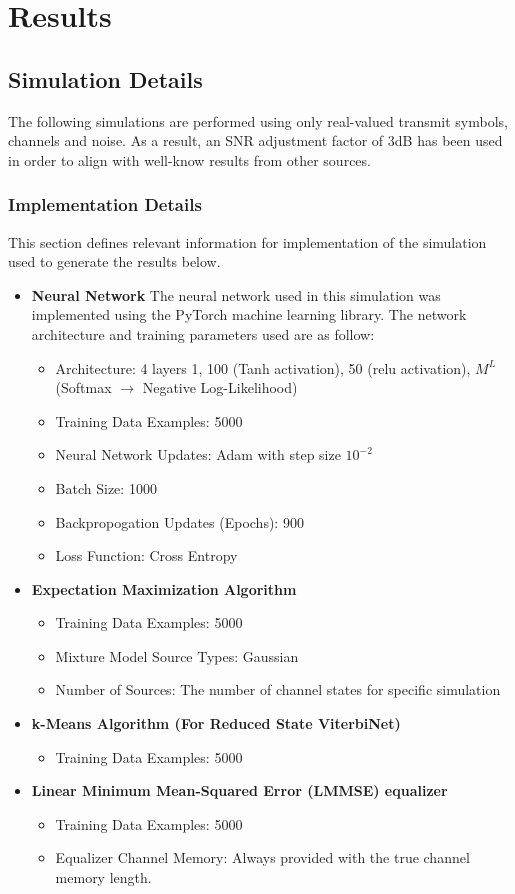 \section{Results}

\subsection{Simulation Details}
The following simulations are performed using only real-valued transmit symbols, channels and noise. As a result, an SNR adjustment factor of 3dB has been used in order to align with well-know results from other sources. 
\subsubsection{Implementation Details}
This section defines relevant information for implementation of the simulation used to generate the results below.
\begin{itemize}
\item \textbf{Neural Network}
The neural network used in this simulation was implemented using the PyTorch machine learning library. The network architecture and training parameters used are as follow:
\begin{itemize}
\item Architecture: 4 layers {1, 100 (Tanh activation), 50 (relu activation), $M^L$ (Softmax $\rightarrow$ Negative Log-Likelihood)}
\item Training Data Examples: 5000
\item Neural Network Updates: Adam \cite{kingma2014adam} with step size $10^{-2}$ 
\item Batch Size: 1000 
\item Backpropogation Updates (Epochs): 900
\item Loss Function: Cross Entropy
\end{itemize}
\item \textbf{Expectation Maximization Algorithm}
\begin{itemize}
\item Training Data Examples: 5000
\item Mixture Model Source Types: Gaussian
\item Number of Sources: The number of channel states for specific simulation
\end{itemize}
\item \textbf{k-Means Algorithm (For Reduced State ViterbiNet)}
\begin{itemize}
\item Training Data Examples: 5000
\end{itemize}
\item \textbf{Linear Minimum Mean-Squared Error (LMMSE) equalizer}
\begin{itemize}
\item Training Data Examples: 5000
\item Equalizer Channel Memory: Always provided with the true channel memory length. 
\end{itemize}

\end{itemize}



